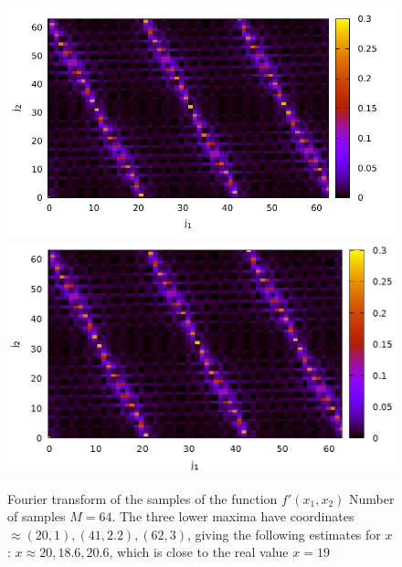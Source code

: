 \begin{figure}
\centering

\ifpdf
\includegraphics[angle=0]
{./part4/quantcomp/picdiscretlog4.pdf}
\else
\includegraphics[angle=0]
{./part4/quantcomp/picdiscretlog4.eps}
\fi

%

\caption{Fourier transform of the samples of the function 
$f'(x_1, x_2)$
Number of samples $M=64$. The three lower maxima have coordinates $\approx (20,1), (41,2.2), (62,
3)$, giving the following estimates for $x$: $x \approx 20, 18.6, 20.6$,
which is close to the real value $x = 19$
} 
\label{fig:part4:quantcomp:dl4}
\end{figure}